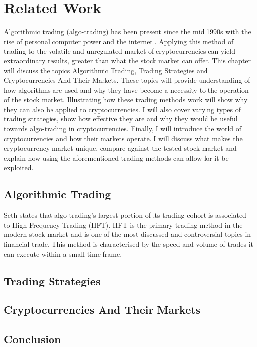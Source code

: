 %
\chapter{Related Work}
\label{sec:related}
Algorithmic trading (algo-trading) has been present since the mid 1990s with the rise of personal computer power and the internet \cite{WEB:PISANI:2010}. Applying this method of trading to the volatile and unregulated market of cryptocurrencies can yield extraordinary results, greater than what the stock market can offer. This chapter will discuss the topics Algorithmic Trading, Trading Strategies and Cryptocurrencies And Their Markets. These topics will provide understanding of how algorithms are used and why they have become a necessity to the operation of the stock market. Illustrating how these trading methods work will show why they can also be applied to cryptocurrencies. I will also cover varying types of trading strategies, show how effective they are and why they would be useful towards algo-trading in cryptocurrencies. Finally, I will introduce the world of cryptocurrencies and how their markets operate. I will discuss what makes the cryptocurrency market unique, compare against the tested stock market and explain how using the aforementioned trading methods can allow for it be exploited. 


\section{Algorithmic Trading}
\label{sec:related:sec1}
Seth \cite{WEB:SETH:0001} states that algo-trading's largest portion of its trading cohort is associated to High-Frequency Trading (HFT). HFT is the primary trading method in the modern stock market and is one of the most discussed and controversial topics in financial trade. This method is characterised by the speed and volume of trades it can execute within a small time frame.



\section{Trading Strategies}
\label{sec:related:sec2}


\section{Cryptocurrencies And Their Markets}
\label{sec:related:sec3}


\section{Conclusion}
\label{sec:related:conclusion}

